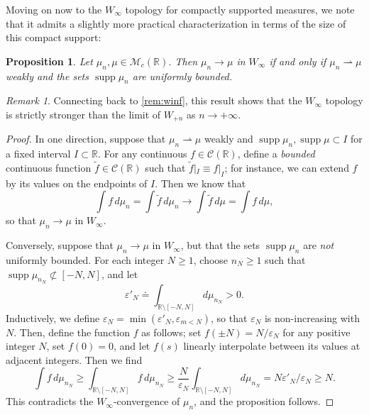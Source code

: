 \documentclass{cams-l} %
\newcommand{\dave}[1]{#1}\newcommand{\davebegin}{}\newcommand{\daveend}{}\newcommand{\george}[1]{#1}
\newcommand{\RR}{\mathbb R}
\newcommand{\cM}{\mathcal M}
\newcommand{\cC}{\mathcal C}
\newcommand{\eps}{\varepsilon}
\newcommand{\supp}{\operatorname{supp}}
\newtheorem{proposition}[theorem]{Proposition}
\theoremstyle{definition}
\theoremstyle{remark}
\newtheorem{remark}[theorem]{Remark}
\numberwithin{equation}{section}
\begin{document}
Moving on now to the $W_\infty$ topology for compactly supported measures, we note that it admits a slightly more practical characterization in terms of the size of this compact support:
\begin{proposition}\label{prop:topology}
    Let $\mu_n,\mu\in\cM_c(\RR)$. Then $\mu_n\to\mu$ in $W_\infty$ if and only if $\mu_n\rightharpoonup\mu$ weakly and the sets $\supp\mu_n$ are uniformly bounded.
\end{proposition}
\begin{remark}
    Connecting back to \cref{rem:winf}, this result shows that the $W_\infty$ topology is strictly stronger than the limit of $W_{+n}$ as $n\to +\infty$.
\end{remark}
\begin{proof}
    In one direction, suppose that $\mu_n\rightharpoonup\mu$ weakly and $\supp\mu_n,\supp\mu\subset I$ for a fixed interval $I\subset\RR$. For any continuous $f\in\cC(\RR)$, define a \emph{bounded} continuous function $\widetilde{f}\in\cC(\RR)$ such that $\widetilde{f}|_I\equiv f|_I$; for instance, we can extend $f$ by its values on the endpoints of $I$. Then we know that
    \[\int f\,d\mu_n = \int \widetilde{f}\,d\mu_n\to \int \widetilde{f}\,d\mu = \int f\,d\mu,\]
    so that $\mu_n\to\mu$ in $W_\infty$.

    Conversely, suppose that $\mu_n\to\mu$ in $W_\infty$, but that the sets $\supp\mu_n$ are \emph{not} uniformly bounded. For each integer $N\geq 1$, choose $n_N\geq 1$ such that $\supp \mu_{n_N}\not\subset [-N,N]$, and let
    \[\eps'_N \doteq \int_{\RR\setminus [-N,N]}d\mu_{n_N} > 0.\]
    \dave{Inductively, we define $\eps_N = \min(\eps'_N, \eps_{m<N})$, so that $\eps_N$ is non-increasing with $N$.} Then, define the function $f$ as follows; set $f(\pm N) = N/\eps_N$ for any positive integer $N$, set $f(0)=0$, and let $f(s)$ linearly interpolate between its values at adjacent integers. Then we find
    \[\int f\,d\mu_{n_N} \geq \int_{\RR\setminus[-N,N]} f\,d\mu_{n_N} \geq \frac{N}{\eps_N}\int_{\RR\setminus[-N,N]} d\mu_{n_N} = N\eps'_N/\eps_N\geq N.\]
    This contradicts the $W_\infty$-convergence of $\mu_n$, and the proposition follows.
\end{proof}
\end{document}
